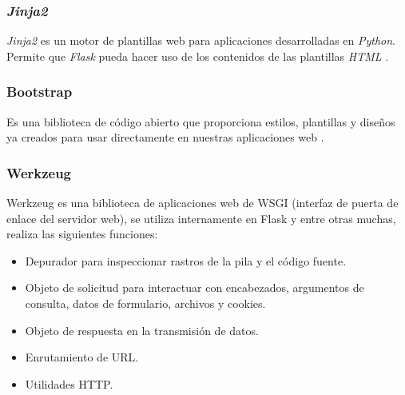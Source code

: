 \subsubsection{\textit{Jinja2}}
\textit{Jinja2} es un motor de plantillas web para aplicaciones desarrolladas en \textit{Python}. Permite que \textit{Flask} pueda hacer uso de los contenidos de las plantillas \textit{HTML} \cite{wiki:jinja2}.

\subsubsection{Bootstrap}
Es una biblioteca de código abierto que proporciona estilos, plantillas y diseños ya creados para usar directamente en nuestras aplicaciones web \cite{wiki:bootstrap}.

\subsubsection{Werkzeug}
Werkzeug es una biblioteca de aplicaciones web de WSGI (interfaz de puerta de enlace del servidor web), se utiliza internamente en Flask y entre otras muchas, realiza las siguientes funciones:
\begin{itemize}
\item Depurador para inspeccionar rastros de la pila y el código fuente.
\item Objeto de solicitud para interactuar con encabezados, argumentos de consulta, datos de formulario, archivos y cookies.
\item Objeto de respuesta en la transmisión de datos.
\item Enrutamiento de URL.
\item Utilidades HTTP.
\end{itemize}